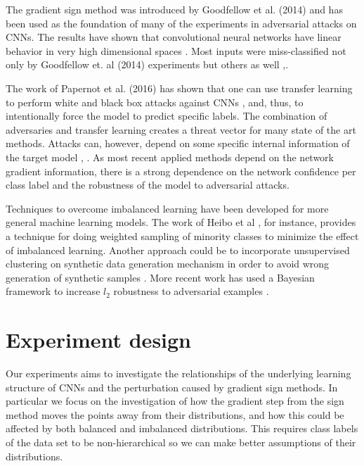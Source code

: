 \documentclass[runningheads,a4paper]{llncs}
\begin{document}
The gradient sign method was introduced by Goodfellow et al. (2014) and has been used as the foundation of many of the experiments in adversarial attacks on CNNs. The results have shown that convolutional neural networks have linear behavior in very high dimensional spaces \cite{goodfellow2014}.  Most inputs were miss-classified not only by Goodfellow et. al (2014) experiments but others as well \cite{billovits},\cite{papernot2016}.

The work of Papernot et al. (2016) has shown that one can use transfer learning to perform white and  black box attacks against CNNs \cite{papernot2016transf}, \cite{yosinski2014transferable} and, thus, to intentionally force the model to predict specific labels. The combination of adversaries and transfer learning creates a threat vector for many state of the art methods. Attacks can, however, depend on some specific internal information of the target model \cite{lowd2005}, \cite{papernot2016transf}. As most recent applied methods depend on the network gradient information, there is a strong dependence on the network confidence per class label and the robustness of the model to adversarial attacks.

Techniques to overcome imbalanced learning have been developed for more general machine learning models. The work of Heibo et al \cite{he2008adasyn}, for instance, provides a technique for doing weighted sampling of minority classes to minimize the effect of imbalanced learning. Another approach could be to incorporate unsupervised clustering on synthetic data generation mechanism in order to avoid wrong generation of synthetic samples \cite{Barua2011}. More recent work has used a Bayesian framework to increase $l_2$ robustness to adversarial examples \cite{billovits}.

\section{Experiment design}

Our experiments aims to investigate the relationships of the underlying learning structure of CNNs and the perturbation caused by gradient sign methods. In particular we focus on the investigation of how the gradient step from the sign method moves the points away from their distributions, and how this could be affected by both balanced and imbalanced distributions. This requires  class labels of the data set to be non-hierarchical so we can make better assumptions of their distributions. 
\end{document}
